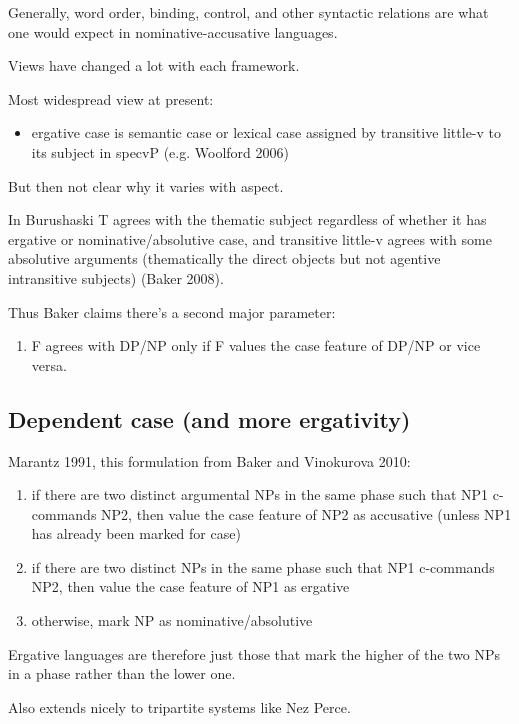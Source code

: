 Generally, word order, binding, control, and other syntactic relations are what one would expect in nominative-accusative languages.

Views have changed a lot with each framework.

Most widespread view at present:

\begin{itemize}
  \item ergative case is semantic case or lexical case assigned by transitive little-v to its subject in specvP (e.g. Woolford 2006)
\end{itemize}

But then not clear why it varies with aspect.

In Burushaski T agrees with the thematic subject regardless of whether it has ergative or nominative/absolutive case, and transitive little-v agrees with some absolutive arguments (thematically the direct objects but not agentive intransitive subjects) (Baker 2008).

Thus Baker claims there's a second major parameter:

\begin{enumerate}
  \item F agrees with DP/NP only if F values the case feature of DP/NP or vice versa.
\end{enumerate}

\subsection*{Dependent case (and more ergativity)}

Marantz 1991, this formulation from Baker and Vinokurova 2010:

\begin{enumerate}
  \item if there are two distinct argumental NPs in the same phase such that NP1 c-commands NP2, then value the case feature of NP2 as accusative (unless NP1 has already been marked for case)
  \item if there are two distinct NPs in the same phase such that NP1 c-commands NP2, then value the case feature of NP1 as ergative
  \item otherwise, mark NP as nominative/absolutive
\end{enumerate}

Ergative languages are therefore just those that mark the higher of the two NPs in a phase rather than the lower one.

Also extends nicely to tripartite systems like Nez Perce.

